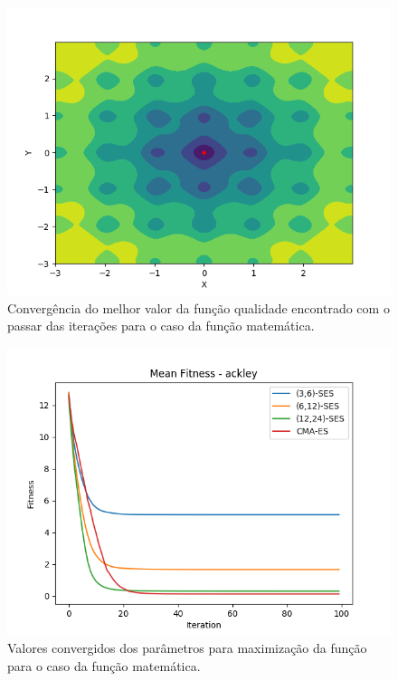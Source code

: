 \documentclass[conference]{IEEEtran}
\begin{document}
\begin{figure}[htbp]
\centering
\centerline{\includegraphics[scale=0.4]{imagens/ackley/cmaes.png}}
\caption{Convergência do melhor valor da função qualidade encontrado com o passar das iterações para o caso da função matemática.}
\label{ackley/cmaes}
\end{figure}

\begin{figure}[htbp]
\centering
\centerline{\includegraphics[scale=0.4]{imagens/ackley/mean_fitness.png}}
\caption{Valores convergidos dos parâmetros para maximização da função para o caso da função matemática.}
\label{ackley/mean_fitness}
\end{figure}
\end{document}
